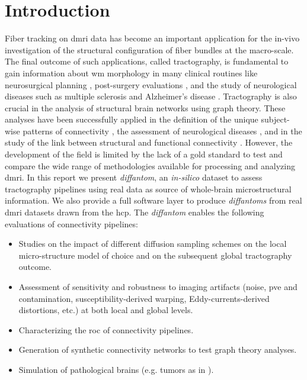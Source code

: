 \documentclass[english]{frontiers/frontiersSCNS} %
\newcommand*\glslines[2][]{\glslink[#1]{#2}{\glsdisp{#2}{\acrlong{#2} --\glsentryshort{#2}--}}}
\begin{document}
\section*{Introduction}
Fiber tracking on \gls*{dmri} data has become an important application for the in-vivo investigation
  of the structural configuration of fiber bundles at the macro-scale.
The final outcome of such applications, called tractography, is fundamental to gain information about
  \gls*{wm} morphology in many clinical routines like neurosurgical planning \citep{golby_interactive_2011},
  post-surgery evaluations \citep{toda_utility_2014},
  and the study of neurological diseases such as multiple sclerosis and Alzheimer's disease
  \citep{chua_diffusion_2008}.
Tractography is also crucial in the analysis of structural brain networks using graph theory.
These analyses have been successfully applied in the definition of the unique subject-wise patterns of connectivity
  \citep{sporns_human_2005}, the assessment of neurological diseases \citep{griffa_structural_2013}, and in the
  study of the link between structural and functional connectivity \citep{messe_predicting_2015}.
However, the development of the field is limited by the lack of a gold standard to test and compare the
  wide range of methodologies available for processing and analyzing \gls*{dmri}.
In this report we present \emph{diffantom}, an \emph{in-silico} dataset to assess tractography pipelines using
  real data as source of whole-brain microstructural information.
We also provide a full software layer to produce \emph{diffantoms} from real \gls*{dmri} datasets
  drawn from the \gls*{hcp}.
The \emph{diffantom} enables the following evaluations of connectivity pipelines:
\begin{itemize}
  \item Studies on the impact of different diffusion sampling schemes on the local micro-structure
  model of choice and on the subsequent global tractography outcome.
  \item Assessment of sensitivity and robustness to imaging artifacts (noise, \acrlong{pve} and \glslines{csf} contamination,
    susceptibility-derived warping, Eddy-currents-derived distortions, etc.) at both local and global levels.
  \item Characterizing the \acrfull*{roc} of connectivity pipelines.
  \item Generation of synthetic connectivity networks to test graph theory analyses.
  \item Simulation of pathological brains (e.g. tumors as in \cite{kaus_simulation_2000}).
\end{itemize}
\end{document}
